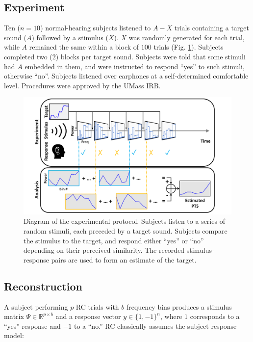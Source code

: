 \documentclass[journal]{IEEEtran}
\begin{document}
\subsection{Experiment}

Ten ($n=10$) normal-hearing subjects listened to $A-X$ trials containing a target sound ($A$) followed by a stimulus ($X$). $X$ was randomly generated for each trial, while $A$ remained the same within a block of $100$ trials (Fig. \ref{fig:experimentdiagram}). Subjects completed two (2) blocks per target sound. Subjects were told that some stimuli had $A$ embedded in them, and were instructed to respond ``yes'' to such stimuli, otherwise ``no''. Subjects listened over earphones at a self-determined comfortable level. Procedures were approved by the UMass IRB.

\begin{figure}[t]
  \centering
  \includegraphics[width=\linewidth]{gfx/experiment_overview.pdf}
  \caption{Diagram of the experimental protocol.
  Subjects listen to a series of random stimuli,
  each preceded by a target sound.
  Subjects compare the stimulus to the target, and respond either ``yes'' or ``no''
  depending on their perceived similarity.
  The recorded stimulus-response pairs are used to form an estimate of the target.}
  \label{fig:experimentdiagram}
\end{figure}

\subsection{Reconstruction}

A subject performing $p$ RC trials with $b$ frequency bins produces a stimulus matrix $\Psi \in \mathbb{R}^{p \times b}$
and a response vector $y \in \{1,-1\}^n$,
where $1$ corresponds to a ``yes'' response and $-1$ to a ``no.'' RC classically assumes the subject response model:
\end{document}
